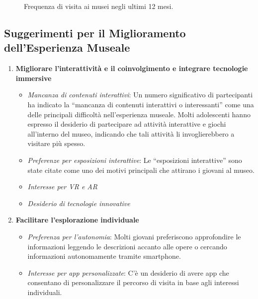 \documentclass{article}
\begin{document}
\begin{figure}[h]
    \centering
    \caption{Frequenza di visita ai musei negli ultimi 12 mesi.}
\end{figure}


\subsection{Suggerimenti per il Miglioramento dell'Esperienza Museale}

\begin{enumerate}
    \item \textbf{Migliorare l'interattività e il coinvolgimento e integrare tecnologie immersive}
        \begin{itemize}
            \item \textit{Mancanza di contenuti interattivi}: Un numero significativo di partecipanti ha indicato la ``mancanza di contenuti interattivi o interessanti'' come una delle principali difficoltà nell'esperienza museale. Molti adolescenti hanno espresso il desiderio di partecipare ad attività interattive e giochi all'interno del museo, indicando che tali attività li invoglierebbero a visitare più spesso.
            \item \textit{Preferenze per esposizioni interattive}: Le ``esposizioni interattive'' sono state citate come uno dei motivi principali che attirano i giovani al museo.
            \item \textit{Interesse per VR e AR}
            \item \textit{Desiderio di tecnologie innovative}
        \end{itemize}

    \item \textbf{Facilitare l'esplorazione individuale}
        \begin{itemize}
            \item \textit{Preferenza per l'autonomia}: Molti giovani preferiscono approfondire le informazioni leggendo le descrizioni accanto alle opere o cercando informazioni autonomamente tramite smartphone.
            \item \textit{Interesse per app personalizzate}: C'è un desiderio di avere app che consentano di personalizzare il percorso di visita in base agli interessi individuali.
        \end{itemize}


\end{enumerate}
\end{document}
